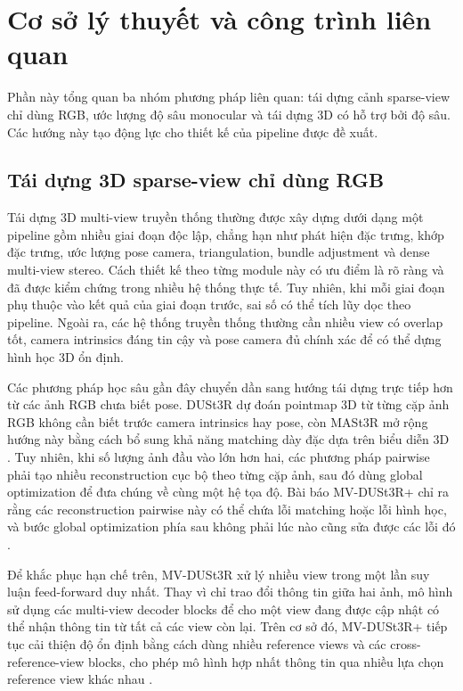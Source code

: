 \documentclass[12pt,a4paper]{article}
\newcommand{\mvd}{MV-DUSt3R}
\newcommand{\mvdp}{MV-DUSt3R+}
\begin{document}
\section{Cơ sở lý thuyết và công trình liên quan}
Phần này tổng quan ba nhóm phương pháp liên quan: tái dựng cảnh sparse-view chỉ dùng RGB, ước lượng độ sâu monocular và tái dựng 3D có hỗ trợ bởi độ sâu. Các hướng này tạo động lực cho thiết kế của pipeline được đề xuất.

\subsection{Tái dựng 3D sparse-view chỉ dùng RGB}
Tái dựng 3D multi-view truyền thống thường được xây dựng dưới dạng một pipeline gồm nhiều giai đoạn độc lập, chẳng hạn như phát hiện đặc trưng, khớp đặc trưng, ước lượng pose camera, triangulation, bundle adjustment và dense multi-view stereo. Cách thiết kế theo từng module này có ưu điểm là rõ ràng và đã được kiểm chứng trong nhiều hệ thống thực tế. Tuy nhiên, khi mỗi giai đoạn phụ thuộc vào kết quả của giai đoạn trước, sai số có thể tích lũy dọc theo pipeline. Ngoài ra, các hệ thống truyền thống thường cần nhiều view có overlap tốt, camera intrinsics đáng tin cậy và pose camera đủ chính xác để có thể dựng hình học 3D ổn định.

Các phương pháp học sâu gần đây chuyển dần sang hướng tái dựng trực tiếp hơn từ các ảnh RGB chưa biết pose. DUSt3R dự đoán pointmap 3D từ từng cặp ảnh RGB không cần biết trước camera intrinsics hay pose, còn MASt3R mở rộng hướng này bằng cách bổ sung khả năng matching dày đặc dựa trên biểu diễn 3D \cite{dust3r_paper,mast3r_paper}. Tuy nhiên, khi số lượng ảnh đầu vào lớn hơn hai, các phương pháp pairwise phải tạo nhiều reconstruction cục bộ theo từng cặp ảnh, sau đó dùng global optimization để đưa chúng về cùng một hệ tọa độ. Bài báo \mvdp{} chỉ ra rằng các reconstruction pairwise này có thể chứa lỗi matching hoặc lỗi hình học, và bước global optimization phía sau không phải lúc nào cũng sửa được các lỗi đó \cite{mvdust3r_paper}.

Để khắc phục hạn chế trên, \mvd{} xử lý nhiều view trong một lần suy luận feed-forward duy nhất. Thay vì chỉ trao đổi thông tin giữa hai ảnh, mô hình sử dụng các multi-view decoder blocks để cho một view đang được cập nhật có thể nhận thông tin từ tất cả các view còn lại. Trên cơ sở đó, \mvdp{} tiếp tục cải thiện độ ổn định bằng cách dùng nhiều reference views và các cross-reference-view blocks, cho phép mô hình hợp nhất thông tin qua nhiều lựa chọn reference view khác nhau \cite{mvdust3r_paper}.
\end{document}
